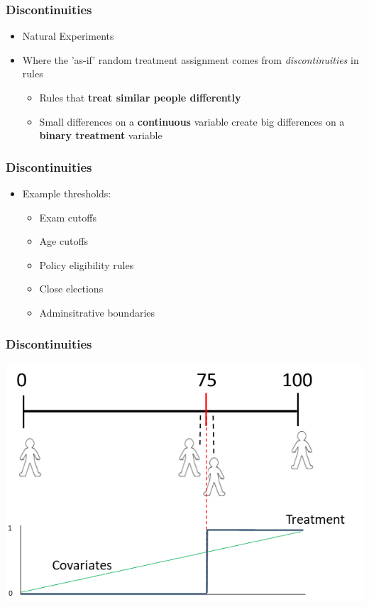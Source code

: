 \documentclass[xcolor=x11names,compress]{beamer}\usepackage[]{graphicx}\usepackage[]{color}
\renewcommand{\(}{\begin{columns}}
\renewcommand{\)}{\end{columns}}
\newcommand{\<}[1]{\begin{column}{#1}}
\renewcommand{\>}{\end{column}}
\begin{document}
\begin{frame}
\frametitle{Discontinuities}
\begin{itemize}
\item Natural Experiments
\pause
\item Where the 'as-if' random treatment assignment comes from \textit{discontinuities} in rules
\pause
\begin{itemize}
\item Rules that \textbf{treat similar people differently}
\pause
\item Small differences on a \textbf{continuous} variable create big differences on a \textbf{binary treatment} variable
\end{itemize}
\end{itemize}
\end{frame}

\begin{frame}
\frametitle{Discontinuities}
\begin{itemize}
\item Example thresholds:
\begin{itemize}
\item Exam cutoffs
\item Age cutoffs
\item Policy eligibility rules
\item Close elections
\item Adminsitrative boundaries
\end{itemize}
\end{itemize}
\end{frame}

\begin{frame}
\frametitle{Discontinuities}
\begin{center}
\includegraphics[scale=0.55]{Scale.png}
\end{center}
\end{frame}
\end{document}
